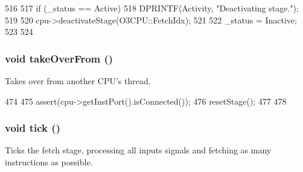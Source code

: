 \begin{DoxyCode}
516 {
517     if (_status == Active) {
518         DPRINTF(Activity, "Deactivating stage.\n");
519 
520         cpu->deactivateStage(O3CPU::FetchIdx);
521 
522         _status = Inactive;
523     }
524 }
\end{DoxyCode}
\hypertarget{classDefaultFetch_a8674059ce345e23aac5086b2c3e24a43}{
\subsubsection[{takeOverFrom}]{\setlength{\rightskip}{0pt plus 5cm}void takeOverFrom ()}}
\label{classDefaultFetch_a8674059ce345e23aac5086b2c3e24a43}
Takes over from another CPU's thread. 


\begin{DoxyCode}
474 {
475     assert(cpu->getInstPort().isConnected());
476     resetStage();
477 
478 }
\end{DoxyCode}
\hypertarget{classDefaultFetch_a873dd91783f9efb4a590aded1f70d6b0}{
\subsubsection[{tick}]{\setlength{\rightskip}{0pt plus 5cm}void tick ()}}
\label{classDefaultFetch_a873dd91783f9efb4a590aded1f70d6b0}
Ticks the fetch stage, processing all inputs signals and fetching as many instructions as possible. 


